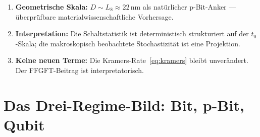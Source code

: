	\begin{keypoint}
		\begin{enumerate}
			\item \textbf{Geometrische Skala:} $D \sim L_8 \approx 22\,\text{nm}$
			als natürlicher p-Bit-Anker --- überprüfbare materialwissenschaftliche
			Vorhersage.
			\item \textbf{Interpretation:} Die Schaltstatistik ist deterministisch
			strukturiert auf der $t_0$-Skala; die makroskopisch beobachtete
			Stochastizität ist eine Projektion.
			\item \textbf{Keine neuen Terme:} Die Kramers-Rate~\eqref{eq:kramers}
			bleibt unverändert. Der FFGFT-Beitrag ist interpretatorisch.
		\end{enumerate}
	\end{keypoint}
	
	\section{Das Drei-Regime-Bild: Bit, p-Bit, Qubit}
	\label{sec:drei-regime}
	
	{\footnotesize
	\begin{center}
	\end{center}
	\begin{center}
	\end{center}
	}
	
